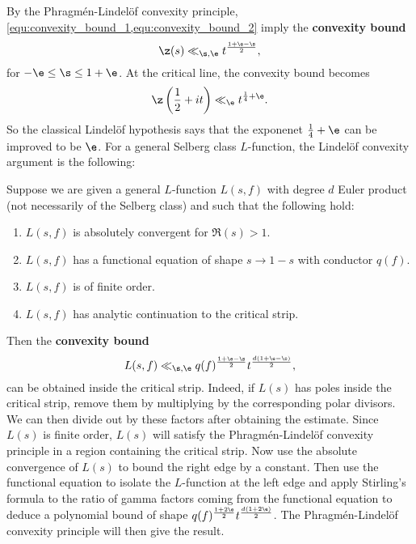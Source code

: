     By the Phragm\'en-Lindel\"of convexity principle, \cref{equ:convexity_bound_1,equ:convexity_bound_2} imply the \textbf{convexity bound}
    \[
      \z(s) \ll_{\s,\e} t^{\frac{1+\e-\s}{2}},
    \]
    for $-\e \le \s \le 1+\e$. At the critical line, the convexity bound becomes
    \begin{equation}\label{equ:convexity_bound_zeta_function}
      \z\left(\frac{1}{2}+it\right) \ll_{\e} t^{\frac{1}{4}+\e}.
    \end{equation}
    So the classical Lindel\"of hypothesis says that the exponenet $\frac{1}{4}+\e$ can be improved to be $\e$. For a general Selberg class $L$-function, the Lindel\"of convexity argument is the following:

    \begin{method}
      Suppose we are given a general $L$-function $L(s,f)$ with degree $d$ Euler product (not necessarily of the Selberg class) and such that the following hold:
      \begin{enumerate}[label=(\roman*)]
        \item $L(s,f)$ is absolutely convergent for $\Re(s) > 1$.
        \item $L(s,f)$ has a functional equation of shape $s \to 1-s$ with conductor $q(f)$.
        \item $L(s,f)$ is of finite order.
        \item $L(s,f)$ has analytic continuation to the critical strip.
      \end{enumerate}
      Then the \textbf{convexity bound}
      \[
        L(s,f) \ll_{\s,\e} q(f)^{\frac{1+\e-\s}{2}}t^{\frac{d(1+\e-\s)}{2}},
      \]
      can be obtained inside the critical strip. Indeed, if $L(s)$ has poles inside the critical strip, remove them by multiplying by the corresponding polar divisors. We can then divide out by these factors after obtaining the estimate. Since $L(s)$ is finite order, $L(s)$ will satisfy the Phragm\'en-Lindel\"of convexity principle in a region containing the critical strip. Now use the absolute convergence of $L(s)$ to bound the right edge by a constant. Then use the functional equation to isolate the $L$-function at the left edge and apply Stirling's formula to the ratio of gamma factors coming from the functional equation to deduce a polynomial bound of shape $q(f)^{\frac{1+2\e}{2}}t^{\frac{d(1+2\e)}{2}}$. The Phragm\'en-Lindel\"of convexity principle will then give the result.
    \end{method}

